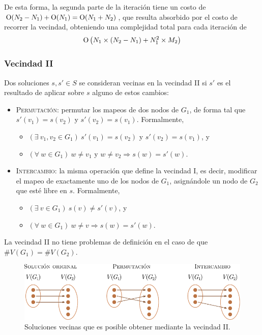 De esta forma, la segunda parte de la iteración tiene un costo de $\operatorname{O}(N_2 -
N_1) + \operatorname{O}(N_1) = \operatorname{O} (N_1 + N_2)$, que resulta absorbido por el costo de
recorrer la vecindad, obteniendo una complejidad total para cada iteración de
\[ \operatorname{O} \left( N_1 \times (N_2 - N_1) + N_1^2 \times M_2 \right) \]

\subsubsection{Vecindad II}
Dos soluciones $s, s' \in S$ se consideran vecinas en la vecindad II
si $s'$ es el resultado de aplicar sobre $s$ alguno de estos cambios:
\begin{itemize}
    \item \textsc{Permutación:} permutar los mapeos de dos nodos de $G_1$, de
    forma tal que $s'(v_1) = s(v_2)$ y $s'(v_2) = s(v_1)$. Formalmente,
    \begin{itemize}
        \item $(\exists \ v_1, v_2 \in G_1)\ s'(v_1) = s(v_2)$ y $s'(v_2) = s
        (v_1)$, y
        \item $(\forall \ w \in G_1)\ w \neq v_1$ y $w \neq v_2
        \Rightarrow s(w) = s'(w)$.
    \end{itemize}
    \item \textsc{Intercambio:} la misma operación que define la vecindad
    I, es decir, modificar el mapeo de exactamente uno de los nodos
    de $G_1$, asignándole un nodo de $G_2$ que esté libre en $s$. Formalmente,
    \begin{itemize}
        \item $(\exists \ v \in G_1)\ s(v) \neq s'(v)$, y
        \item $(\forall \ w \in G_1)\ w \neq v \Rightarrow s(w) = s'(w)$.
    \end{itemize}
\end{itemize}

La vecindad II no tiene problemas de definición en el caso de que $\#V(G_1)
= \#V (G_2)$.

\begin{figure}[htbp]
    \centering
    \includegraphics{imagenes/ex5_vecindad2.pdf}
    \caption{Soluciones vecinas que es posible obtener mediante la vecindad
    II.}
\end{figure}

